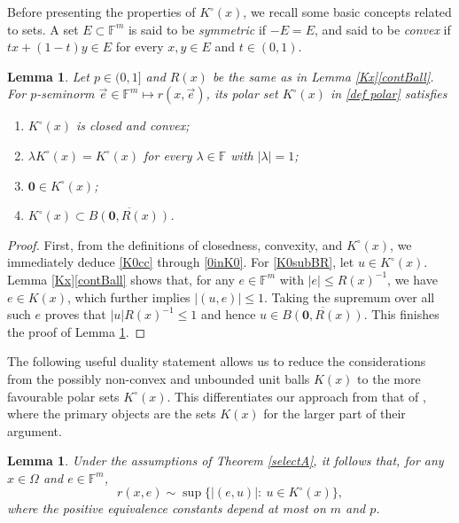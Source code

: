 \documentclass[11pt, reqno]{amsart}
\newtheorem{lemma}[theorem]{Lemma}
\theoremstyle{definition}
\theoremstyle{remark}
\numberwithin{equation}{section}
\newcommand{\F}{\mathbb F}
\newcommand{\ve}{\vec e}
\newcommand{\abs}[1]{|#1|}
\begin{document}
Before presenting the properties of $K^\circ(x)$,
we recall some basic concepts related to sets.
A set $E\subset\mathbb F^m$
is said to be \emph{symmetric} if $-E=E$,
and said to be \emph{convex} if
$tx+(1-t)y\in E$ for every $x,y\in E$ and $t\in(0,1)$.

\begin{lemma}\label{KxPolar}
Let $p\in(0,1]$ and $R(x)$ be the same as in Lemma \ref{Kx}\eqref{contBall}.
For $p$-seminorm $\ve\in\F^m\mapsto r(x,\ve)$,
its polar set $K^\circ(x)$ in \eqref{def polar} satisfies
\begin{enumerate}[\rm(i)]
\item\label{K0cc} $K^\circ(x)$ is closed and convex;

\item\label{K0sym} $\lambda K^\circ(x)=K^\circ(x)$ for every $\lambda\in\F$ with $\abs{\lambda}=1$;

\item\label{0inK0} $\mathbf 0\in K^\circ(x)$;

\item\label{K0subBR} $K^\circ(x)\subset\overline{B(\mathbf 0,R(x))}$.
\end{enumerate}
\end{lemma}

\begin{proof} First, from the definitions of closedness, convexity,
and $K^\circ(x)$, we immediately deduce \eqref{K0cc} through \eqref{0inK0}.
For \eqref{K0subBR}, let $u\in K^\circ(x)$.
Lemma \ref{Kx}\eqref{contBall}  shows that,
for any $e\in\mathbb F^m$ with $\abs{e}\leq R(x)^{-1}$,
we have $e\in K(x)$, which further implies $|(u,e)|\leq 1$.
Taking the supremum over all such $e$ proves that
$\abs{u}R(x)^{-1}\leq 1$ and hence
$u\in\overline{B(\mathbf 0,R(x))}$.
This finishes the proof of Lemma \ref{KxPolar}.
\end{proof}

The following useful duality statement allows us to reduce the considerations from the possibly non-convex and unbounded unit balls $K(x)$ to the more favourable polar sets $K^\circ(x)$. This differentiates our approach from that of \cite[Appendix A.4]{DKPS}, where the primary objects are the sets $K(x)$ for the larger part of their argument.

\begin{lemma}\label{dual norm}
Under the assumptions of Theorem \ref{selectA},
it follows that, for any $x\in\Omega$ and $e\in\F^m$,
\begin{equation*}
r(x,e)\sim\sup\{|(e,u)|:\ u\in K^\circ(x)\},
\end{equation*}
where the positive equivalence constants depend at most on $m$ and $p$.
\end{lemma}
\end{document}
